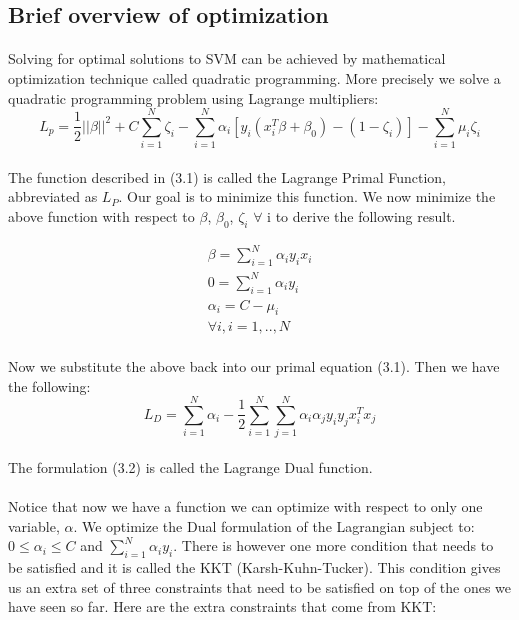 \documentclass[twoside]{article}
\begin{document}
\subsection{Brief overview of optimization}
\paragraph{}
Solving for optimal solutions to SVM can be achieved by mathematical optimization technique called quadratic programming. More precisely we solve a quadratic programming problem using Lagrange multipliers:
\begin{equation}
    L_p = \frac{1}{2}||\beta||^{2} + C\sum_{i=1}^{N}\zeta_i - \sum_{i=1}^{N}\alpha_{i}[y_i(x_i^{T}\beta+\beta_0) - (1-\zeta_i)] - \sum_{i=1}^{N}\mu_{i}\zeta_i
\end{equation}
\\
The function described in (3.1) is called the Lagrange Primal Function, abbreviated as $L_P$. Our goal is to minimize this function. We now minimize the above function with respect to $\beta$, $\beta_0$, $\zeta_i$ $\forall$ i to derive the following result. 

\begin{align*} 
\beta = \sum_{i=1}^{N}\alpha_{i}y_{i}x_{i} \\ 
0 = \sum_{i=1}^{N}\alpha_{i}y_{i} \\
\alpha_{i} = C - \mu_{i}\\
\forall i, i = 1,..,N
\end{align*}
\\
Now we substitute the above back into our primal equation (3.1). Then we have the following:
\\
\begin{equation}
    L_D = \sum_{i=1}^{N}\alpha_{i} - \frac{1}{2}\sum_{i=1}^{N}\sum_{j=1}^{N}\alpha_{i}\alpha_{j}y_{i}y_{j}x_{i}^{T}x_{j}
\end{equation}
\\
The formulation (3.2) is called the Lagrange Dual function.
\paragraph{}
Notice that now we have a function we can optimize with respect to only one variable, $\alpha$.
We optimize the Dual formulation of the Lagrangian subject to: $0 \leq \alpha_i \leq C$ and $\sum_{i=1}^{N}\alpha_iy_i$. There is however one more condition that needs to be satisfied and it is called the KKT (Karsh-Kuhn-Tucker). This condition gives us an extra set of three constraints that need to be satisfied on top of the ones we have seen so far. Here are the extra constraints that come from KKT:
\end{document}
